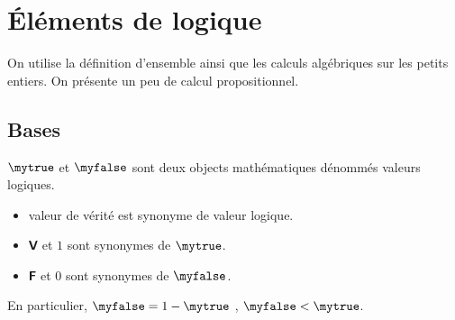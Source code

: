 
\section{Éléments de logique}
On utilise la définition d'ensemble ainsi que les calculs algébriques sur les petits entiers. On présente un peu de
calcul propositionnel.

\subsection{Bases}
\begin{axiom}
[Proposition]
\(\mytrue\) et \(\myfalse\) sont deux objects mathématiques dénommés valeurs logiques.
\end{axiom}
\begin{vocabulary}
\par\noindent
\begin{itemize}
\item
valeur de vérité est synonyme de valeur logique.
\item
\(𝗩\) et \(1\) sont synonymes de \(\mytrue\).
\item
\(𝗙\) et \(0\) sont synonymes de \(\myfalse\).
\end{itemize}
\end{vocabulary}
En particulier, \(\myfalse=1-\mytrue\) ,
\(\myfalse<\mytrue\).

